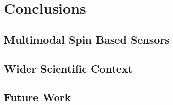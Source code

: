 \chapter{Conclusions}

\lipsum[1]
\section{Multimodal Spin Based Sensors}
\lipsum[2-4]
\section{Wider Scientific Context}
\cite{Kraus2013}
\lipsum[5-8]

\section{Future Work}
\lipsum[9]
%
%
%
%
